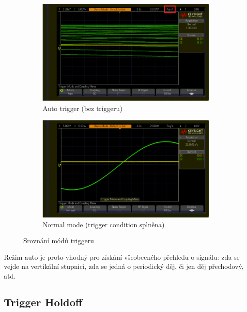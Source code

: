 \documentclass[twoside]{article}
\begin{document}
\begin{figure}[htbp]
	\centering
	\begin{subfigure}{0.45\textwidth}
		\includegraphics[width=\linewidth]{trigger_auto.png                      }
		\caption{Auto trigger (bez triggeru)}
	\end{subfigure}
	\begin{subfigure}{0.45\textwidth}
		\includegraphics[width=\linewidth]{trigger_normal.png                    }
		\caption{Normal mode (trigger condition splněna)}
	\end{subfigure}
	\caption{Srovnání módů triggeru}
	\label{fig:trigger_mode}
\end{figure}

Režim auto je proto vhodný pro získání všeobecného přehledu o signálu: zda se vejde na vertikální
stupnici, zda se jedná o periodický děj, či jen děj přechodový, atd.

\subsection{Trigger Holdoff}
\end{document}
